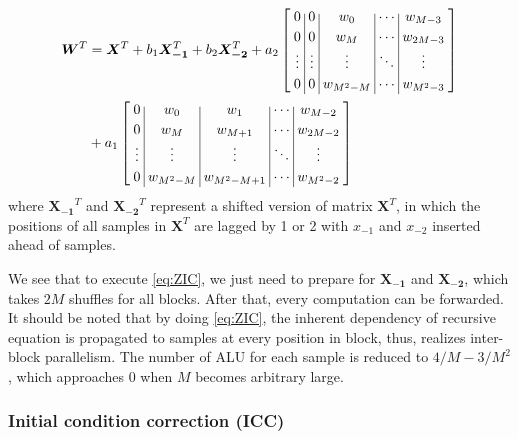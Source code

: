 \begin{equation}
    \label{eq:ZIC}
    \begin{aligned}
        \bm{W}^T &= \bm{X}^T + b_1\bm{X_{-1}}^T + b_2\bm{X_{-2}}^T 
             + a_2\left[\arraycolsep=2.5pt\def\arraystretch{1.2}
                \begin{array}{c|c|c|c|c}
                0 & 0 & w_0 & \cdots & w_{M-3} \\ 
                0 & 0 & w_M & \cdots & w_{2M-3} \\
                \vdots & \vdots & \vdots & \ddots & \vdots \\
                0 & 0 & w_{M^2-M} & \cdots & w_{M^2-3} \\
                \end{array}\right]  \\
            &+ a_1\left[\arraycolsep=2.5pt\def\arraystretch{1.2}
                \begin{array}{c|c|c|c|c}
                0 & w_0 & w_1 & \cdots & w_{M-2} \\ 
                0 & w_M & w_{M+1} & \cdots & w_{2M-2} \\
                \vdots & \vdots & \vdots & \ddots & \vdots \\
                0 & w_{M^2-M} & w_{M^2-M+1} & \cdots & w_{M^2-2} \\
                \end{array}\right]
    \end{aligned}
\end{equation}
where $\bm{X_{-1}}^T$ and $\bm{X_{-2}}^T$ represent a shifted version of matrix $\bm{X}^T$, in which the positions of all samples
in $\bm{X}^T$ are lagged by 1 or 2 with $x_{-1}$ and $x_{-2}$ inserted ahead of samples.

We see that to execute \eqref{eq:ZIC}, we just need to prepare for $\bm{X_{-1}}$ and $\bm{X_{-2}}$, which takes $2M$ shuffles for all blocks.
After that, every computation can be forwarded. It should be noted that by doing \eqref{eq:ZIC}, 
the inherent dependency of recursive equation is propagated to samples at every position in block, thus, realizes inter-block parallelism. 
The number of ALU for each sample is reduced to $4/M{-}3/M^2$, which approaches 0 when $M$ becomes arbitrary large.

\subsubsection{Initial condition correction (ICC)}

